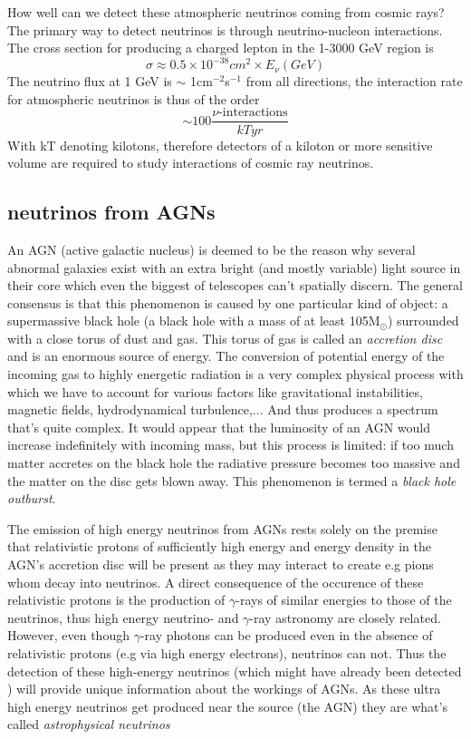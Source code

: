 How well can we detect these atmospheric neutrinos coming from cosmic rays?
The primary way to detect neutrinos is through neutrino-nucleon interactions.
The cross section for producing a charged lepton
\cite{gaisser_engel_resconi_2016} in the 1-3000 GeV region is
\begin{equation}
	\sigma \approx 0.5\times 10^{-38} cm^2\times E_\nu (GeV)
\end{equation}
The neutrino flux at 1 GeV is $\sim$ 1cm$^{-2}$s$^{-1}$ from all directions, the interaction rate for
atmospheric neutrinos is thus of the order 
\begin{equation}
	\sim 100\frac{\nu\text{-interactions}}{kT yr}
\end{equation}
With kT denoting kilotons, therefore detectors of a kiloton or more sensitive
volume are required to study interactions of cosmic ray
neutrinos\cite{GreisenAndReines}.

\subsection{neutrinos from AGNs}
An AGN (active galactic nucleus) is deemed to be the reason why several abnormal galaxies exist with
an extra bright (and mostly variable) light source in their core which even the biggest of telescopes
can't spatially discern. The general consensus is that this phenomenon is caused by one particular
kind of object: a supermassive black hole (a black hole with a mass of at least 105M$_\odot$) surrounded with
a close torus of dust and gas\cite{Shields_1999}.
This torus of gas is called an \textit{accretion disc} and is an enormous source of energy. The conversion
of potential energy of the incoming gas to highly energetic radiation is a very complex physical process
with which we have to account for various factors like gravitational instabilities, magnetic fields, hydrodynamical
turbulence,... And thus produces a spectrum that's quite complex.
It would appear that the luminosity of an AGN would increase indefinitely with incoming mass, but this process is 
limited: if too much matter accretes on the black hole the radiative pressure becomes too massive and the 
matter on the disc gets blown away. This phenomenon is termed a \textit{black hole outburst}.

The emission of high energy neutrinos from AGNs rests solely on the premise
that relativistic protons of sufficiently high energy and energy density in the
AGN's accretion disc will be present \cite{NASANeutrinos} as they may interact
to create e.g pions whom decay into neutrinos. A direct consequence of the occurence of these
relativistic protons is the production of $\gamma$-rays of similar energies to
those of the neutrinos, thus high energy neutrino- and $\gamma$-ray astronomy are
closely related.  However, even though $\gamma$-ray photons can be produced
even in the absence of relativistic protons (e.g via high energy electrons),
neutrinos can not.  Thus the detection of these high-energy neutrinos (which
might have already been detected \cite{AGNNeutrino}) will provide unique
information about the workings of AGNs.
As these ultra high energy neutrinos get produced near the source (the AGN)
they are what's called \textit{astrophysical neutrinos}

